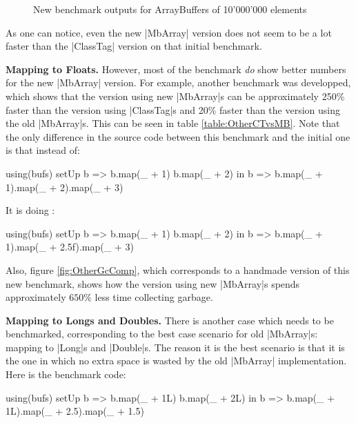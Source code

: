 

\begin{figure}
\caption{New benchmark outputs for ArrayBuffers of 10'000'000 elements}
\label{fig:NewGcComp}
\end{figure}

As one can notice, even the new |MbArray| version does not seem to be a lot faster than the |ClassTag| version on that initial benchmark. 

\textbf{Mapping to Floats.} However, most of the benchmark \emph{do} show better numbers for the new |MbArray| version. For example, another benchmark was developped, which shows that the version using new |MbArray|s can be approximately 250\% faster than the version using |ClassTag|s and 20\% faster than the version using the old |MbArray|s. This can be seen in table \ref{table:OtherCTvsMB}. Note that the only difference in the source code between this benchmark and the initial one is that instead of:

\begin{lstlisting-nobreak}
  using(bufs) setUp {
    b => 
      b.map(_ + 1)
      b.map(_ + 2)
  } in {
    b => b.map(_ + 1).map(_ + 2).map(_ + 3)
  }
\end{lstlisting-nobreak}

It is doing : 

\begin{lstlisting-nobreak}
  using(bufs) setUp {
    b => 
      b.map(_ + 1)
      b.map(_ + 2)
  } in {
    b => b.map(_ + 1).map(_ + 2.5f).map(_ + 3)
  }
\end{lstlisting-nobreak}

Also, figure \ref{fig:OtherGcComp}, which corresponds to a handmade version of this new benchmark, shows how the version using new |MbArray|s spends approximately $650\%$ less time collecting garbage.

\textbf{Mapping to Longs and Doubles.} There is another case which needs to be benchmarked, corresponding to the best case scenario for old |MbArray|s: mapping to |Long|s and |Double|s. The reason it is the best scenario is that it is the one in which no extra space is wasted by the old |MbArray| implementation. Here is the benchmark code:

\begin{lstlisting-nobreak}
  using(bufs) setUp {
    b => 
      b.map(_ + 1L)
      b.map(_ + 2L)
  } in {
    b => b.map(_ + 1L).map(_ + 2.5).map(_ + 1.5)
  }
\end{lstlisting-nobreak}

